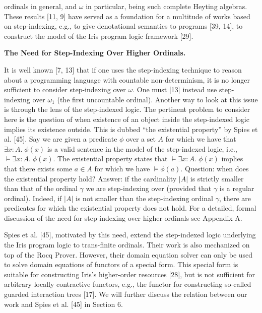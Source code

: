ordinals in general, and $\omega$ in particular, being such complete Heyting algebras. These results [11, 9] have served as a foundation for a multitude of works based on step-indexing, e.g., to give denotational semantics to programs [39, 14], to construct the model of the Iris program logic framework [29].\par
 
 
 
 
\par\medskip\noindent\textbf{The Need for Step-Indexing Over Higher Ordinals.}\par
 
 
It is well known [7, 13] that if one uses the step-indexing technique to reason about a programming language with countable non-determinism, it is no longer sufficient to consider step-indexing over $\omega$. One must [13] instead use step-indexing over $\omega_{1}$ (the first uncountable ordinal). Another way to look at this issue is through the lens of the step-indexed logic. The pertinent problem to consider here is the question of when existence of an object inside the step-indexed logic implies its existence outside. This is dubbed “the existential property” by Spies et al. [45]. Say we are given a predicate $\phi$ over a set $A$ for which we have that $\exists x:A.\;\phi(x)$ is a valid sentence in the model of the step-indexed logic, i.e., $\models\exists x:A.\;\phi(x)$. The existential property states that $\models\exists x:A.\;\phi(x)$ implies that there exists some $a\in A$ for which we have $\models\phi(a)$. Question: when does the existential property hold? Answer: if the cardinality $\left|A\right|$ is strictly smaller than that of the ordinal $\gamma$ we are step-indexing over (provided that $\gamma$ is a regular ordinal). Indeed, if $\left|A\right|$ is not smaller than the step-indexing ordinal $\gamma$, there are predicates for which the existential property does not hold. For a detailed, formal discussion of the need for step-indexing over higher-ordinals see Appendix A.\par
 
 
 
Spies et al. [45], motivated by this need, extend the step-indexed logic underlying the Iris program logic to trans-finite ordinals. Their work is also mechanized on top of the Rocq Prover. However, their domain equation solver can only be used to solve domain equations of functors of a special form. This special form is suitable for constructing Iris’s higher-order resources [28], but is not sufficient for arbitrary locally contractive functors, e.g., the functor for constructing so-called guarded interaction trees [17]. We will further discuss the relation between our work and Spies et al. [45] in Section 6.\par
 
